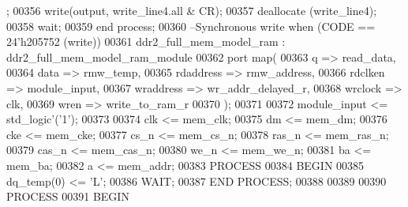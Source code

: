 \begin{DoxyCode}
      ;
00356       \textcolor{vhdlchar}{write}\textcolor{vhdlchar}{(}\textcolor{vhdlchar}{output}\textcolor{vhdlchar}{,} \textcolor{vhdlchar}{write\_line4}\textcolor{vhdlchar}{.}\textcolor{keywordflow}{all} \textcolor{vhdlchar}{&} \textcolor{vhdlchar}{CR}\textcolor{vhdlchar}{)};
00357       \textcolor{vhdlchar}{deallocate} \textcolor{vhdlchar}{(}\textcolor{vhdlchar}{write\_line4}\textcolor{vhdlchar}{)};
00358     \textcolor{keywordflow}{wait};
00359   \textcolor{keywordflow}{end} \textcolor{keywordflow}{process};
00360 \textcolor{keyword}{  --Synchronous write when (CODE == 24'h205752 (write))}
00361   ddr2_full_mem_model_ram : ddr2_full_mem_model_ram_module
00362     \textcolor{keywordflow}{port} \textcolor{keywordflow}{map}(
00363       q => read_data,
00364       data => rmw_temp,
00365       rdaddress => rmw_address,
00366       rdclken => module_input,
00367       wraddress => wr_addr_delayed_r,
00368       wrclock => clk,
00369       wren => write_to_ram_r
00370     \textcolor{vhdlchar}{)};
00371 
00372   \textcolor{vhdlchar}{module_input} \textcolor{vhdlchar}{<=} \textcolor{comment}{std\_logic}\textcolor{vhdlchar}{'}\textcolor{vhdlchar}{(}\textcolor{vhdlchar}{'}\textcolor{vhdllogic}{}\textcolor{vhdllogic}{1}\textcolor{vhdlchar}{'}\textcolor{vhdlchar}{)};
00373 
00374   \textcolor{vhdlchar}{clk} \textcolor{vhdlchar}{<=} \textcolor{vhdlchar}{mem_clk};
00375   \textcolor{vhdlchar}{dm} \textcolor{vhdlchar}{<=} \textcolor{vhdlchar}{mem_dm};
00376   \textcolor{vhdlchar}{cke} \textcolor{vhdlchar}{<=} \textcolor{vhdlchar}{mem_cke};
00377   \textcolor{vhdlchar}{cs_n} \textcolor{vhdlchar}{<=} \textcolor{vhdlchar}{mem_cs_n};
00378   \textcolor{vhdlchar}{ras_n} \textcolor{vhdlchar}{<=} \textcolor{vhdlchar}{mem_ras_n};
00379   \textcolor{vhdlchar}{cas_n} \textcolor{vhdlchar}{<=} \textcolor{vhdlchar}{mem_cas_n};
00380   \textcolor{vhdlchar}{we_n} \textcolor{vhdlchar}{<=} \textcolor{vhdlchar}{mem_we_n};
00381   \textcolor{vhdlchar}{ba} \textcolor{vhdlchar}{<=} \textcolor{vhdlchar}{mem_ba};
00382   \textcolor{vhdlchar}{a} \textcolor{vhdlchar}{<=} \textcolor{vhdlchar}{mem_addr};
00383   \textcolor{keywordflow}{PROCESS}
00384   \textcolor{keywordflow}{BEGIN}
00385     \textcolor{vhdlchar}{dq_temp}\textcolor{vhdlchar}{(}\textcolor{vhdllogic}{}\textcolor{vhdllogic}{0}\textcolor{vhdlchar}{)} \textcolor{vhdlchar}{<=} \textcolor{vhdlchar}{'}\textcolor{vhdlchar}{L}\textcolor{vhdlchar}{'};  
00386   \textcolor{keywordflow}{WAIT};
00387   \textcolor{keywordflow}{END} \textcolor{keywordflow}{PROCESS};
00388   
00389   
00390   \textcolor{keywordflow}{PROCESS}
00391   \textcolor{keywordflow}{BEGIN}

\end{DoxyCode}
